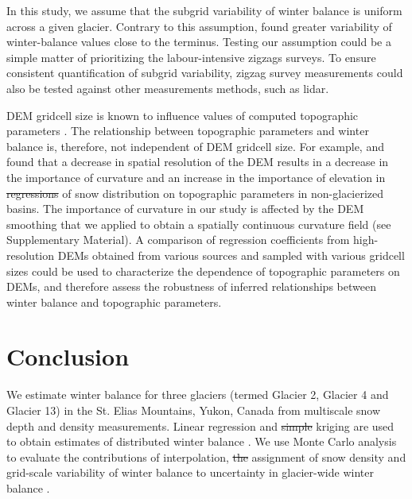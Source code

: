 \documentclass[review,oneside, letterpaper]{igs} %
\providecommand{\DIFadd}[1]{{\protect\color{blue}\uwave{#1}}} %
\providecommand{\DIFdel}[1]{{\protect\color{red}\sout{#1}}}                      %
\providecommand{\DIFaddbegin}{} %
\providecommand{\DIFaddend}{} %
\providecommand{\DIFdelbegin}{} %
\providecommand{\DIFdelend}{} %
\newcommand{\DIFscaledelfig}{0.5}
\newlength{\DIFdelgraphicswidth} %
\newlength{\DIFdelgraphicsheight} %
\newcommand{\DIFaddincludegraphics}[2][]{{\color{blue}\fbox{\DIFOincludegraphics[#1]{#2}}}} %
\newcommand{\DIFdelincludegraphics}[2][]{%
\sbox{\DIFdelgraphicsbox}{\DIFOincludegraphics[#1]{#2}}%
\settoboxwidth{\DIFdelgraphicswidth}{\DIFdelgraphicsbox} %
\settoboxtotalheight{\DIFdelgraphicsheight}{\DIFdelgraphicsbox} %
\scalebox{\DIFscaledelfig}{%
\parbox[b]{\DIFdelgraphicswidth}{\usebox{\DIFdelgraphicsbox}\\[-\baselineskip] \rule{\DIFdelgraphicswidth}{0em}}\llap{\resizebox{\DIFdelgraphicswidth}{\DIFdelgraphicsheight}{%
\setlength{\unitlength}{\DIFdelgraphicswidth}%
\begin{picture}(1,1)%
\thicklines\linethickness{2pt} %
{\color[rgb]{1,0,0}\put(0,0){\framebox(1,1){}}}%
{\color[rgb]{1,0,0}\put(0,0){\line( 1,1){1}}}%
{\color[rgb]{1,0,0}\put(0,1){\line(1,-1){1}}}%
\end{picture}%
}\hspace*{3pt}}} %
} %
\DeclareRobustCommand{\DIFaddbegin}{\DIFOaddbegin \let\includegraphics\DIFaddincludegraphics} %
\DeclareRobustCommand{\DIFaddend}{\DIFOaddend \let\includegraphics\DIFOincludegraphics} %
\DeclareRobustCommand{\DIFdelbegin}{\DIFOdelbegin \let\includegraphics\DIFdelincludegraphics} %
\DeclareRobustCommand{\DIFdelend}{\DIFOaddend \let\includegraphics\DIFOincludegraphics} %
\begin{document}
In this study, we assume that the subgrid variability of winter balance is uniform across a given glacier. Contrary to this assumption, \cite{McGrath2015} found greater variability of winter-balance values close to the terminus. Testing our assumption could be a simple matter of prioritizing the labour-intensive zigzags surveys. To ensure consistent quantification of subgrid variability, zigzag survey measurements could also be tested against other measurements methods, such as lidar. 

DEM gridcell size is known to influence values of computed topographic parameters \citep{Zhang1994, Garbrecht1994, Guo-an2001, Lopez2010}. The relationship between topographic parameters and winter balance is, therefore, not independent of DEM gridcell size. For example, \cite{Kienzle2004} and \cite{Lopez2010} found that a decrease in spatial resolution of the DEM results in a decrease in the importance of curvature and an increase in the importance of elevation in \DIFdelbegin \DIFdel{regressions }\DIFdelend \DIFaddbegin \DIFadd{LR }\DIFaddend of snow distribution on topographic parameters in non-glacierized basins. The importance of curvature in our study is affected by the DEM smoothing that we applied to obtain a spatially continuous curvature field (see Supplementary Material\DIFaddbegin \DIFadd{, Fig. S1}\DIFaddend ). A comparison of regression coefficients from high-resolution DEMs obtained from various sources and sampled with various gridcell sizes could be used to characterize the dependence of topographic parameters on DEMs, and therefore assess the robustness of inferred relationships between winter balance and topographic parameters. 


\section{Conclusion}

We estimate winter balance for three glaciers (termed Glacier 2, Glacier 4 and Glacier 13) in the St. Elias Mountains, Yukon, Canada from multiscale snow depth and density measurements. Linear regression and \DIFdelbegin \DIFdel{simple }\DIFdelend \DIFaddbegin \DIFadd{ordinary }\DIFaddend kriging are used to obtain estimates of distributed winter balance \DIFaddbegin \DIFadd{($b_\mathrm{w}$)}\DIFaddend . We use Monte Carlo analysis to evaluate the contributions of interpolation, \DIFdelbegin \DIFdel{the }\DIFdelend assignment of snow density and grid-scale variability of winter balance to uncertainty in \DIFaddbegin \DIFadd{estimates of }\DIFaddend glacier-wide winter balance \DIFaddbegin \DIFadd{($B_\mathrm{w}$)}\DIFaddend . 
\end{document}
